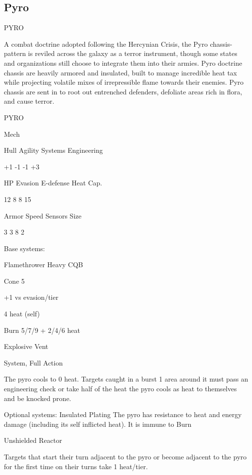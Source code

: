 \subsection{Pyro}

                                                   PYRO

A combat doctrine adopted following the Hercynian Crisis, the Pyro chassis-pattern is reviled
across the galaxy as a terror instrument, though some states and organizations still choose to
integrate them into their armies. Pyro doctrine chassis are heavily armored and insulated, built to
manage incredible heat tax while projecting volatile mixes of irrepressible flame towards their
enemies. Pyro chassis are sent in to root out entrenched defenders, defoliate areas rich in flora,
and cause terror.


 PYRO

 Mech

 Hull       Agility      Systems       Engineering

 +1         -1           -1            +3

 HP         Evasion      E-defense     Heat Cap.

 12         8            8             15

 Armor      Speed        Sensors       Size

 3          3            8             2

Base systems:

Flamethrower
Heavy CQB

Cone 5

+1 vs evasion/tier

4 heat (self)

Burn 5/7/9 + 2/4/6 heat


Explosive Vent

System, Full Action

The pyro cools to 0 heat. Targets caught in a burst 1 area around it must pass an engineering
check or take half of the heat the pyro cools as heat to themselves and be knocked prone.


Optional systems:
Insulated Plating
The pyro has resistance to heat and energy damage (including its self inflicted heat). It is immune
to Burn


Unshielded Reactor




Targets that start their turn adjacent to the pyro or become adjacent to the pyro for the first time
on their turns take 1 heat/tier.


